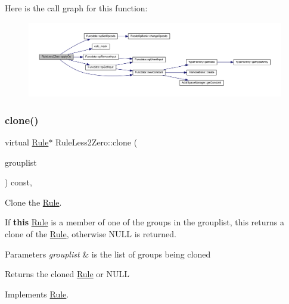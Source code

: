 Here is the call graph for this function\+:
\nopagebreak
\begin{figure}[H]
\begin{center}
\leavevmode
\includegraphics[width=350pt]{class_rule_less2_zero_ac9d89e7b8899c76a40f88b3b0a5a0d74_cgraph}
\end{center}
\end{figure}
\mbox{\label{class_rule_less2_zero_a586bf16d8b5f4d60990d3594ad2a0b87}} 
\subsubsection{\texorpdfstring{clone()}{clone()}}
{\footnotesize\ttfamily virtual \mbox{\hyperlink{class_rule}{Rule}}$\ast$ Rule\+Less2\+Zero\+::clone (\begin{DoxyParamCaption}\item[{const \mbox{\hyperlink{class_action_group_list}{Action\+Group\+List}} \&}]{grouplist }\end{DoxyParamCaption}) const\hspace{0.3cm}{\ttfamily [inline]}, {\ttfamily [virtual]}}



Clone the \mbox{\hyperlink{class_rule}{Rule}}. 

If {\bfseries{this}} \mbox{\hyperlink{class_rule}{Rule}} is a member of one of the groups in the grouplist, this returns a clone of the \mbox{\hyperlink{class_rule}{Rule}}, otherwise N\+U\+LL is returned. 
\begin{DoxyParams}{Parameters}
{\em grouplist} & is the list of groups being cloned \\
\hline
\end{DoxyParams}
\begin{DoxyReturn}{Returns}
the cloned \mbox{\hyperlink{class_rule}{Rule}} or N\+U\+LL 
\end{DoxyReturn}


Implements \mbox{\hyperlink{class_rule_a70de90a76461bfa7ea0b575ce3c11e4d}{Rule}}.



